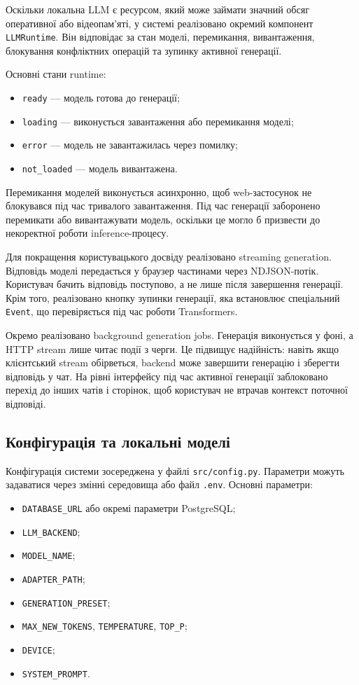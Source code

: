 Оскільки локальна LLM є ресурсом, який може займати значний обсяг оперативної або відеопам'яті, у системі реалізовано окремий компонент \texttt{LLMRuntime}. Він відповідає за стан моделі, перемикання, вивантаження, блокування конфліктних операцій та зупинку активної генерації.

Основні стани runtime:
\begin{itemize}
  \item \texttt{ready} --- модель готова до генерації;
  \item \texttt{loading} --- виконується завантаження або перемикання моделі;
  \item \texttt{error} --- модель не завантажилась через помилку;
  \item \texttt{not\_loaded} --- модель вивантажена.
\end{itemize}

Перемикання моделей виконується асинхронно, щоб web-застосунок не блокувався під час тривалого завантаження. Під час генерації заборонено перемикати або вивантажувати модель, оскільки це могло б призвести до некоректної роботи inference-процесу.

Для покращення користувацького досвіду реалізовано streaming generation. Відповідь моделі передається у браузер частинами через NDJSON-потік. Користувач бачить відповідь поступово, а не лише після завершення генерації. Крім того, реалізовано кнопку зупинки генерації, яка встановлює спеціальний \texttt{Event}, що перевіряється під час роботи Transformers.

Окремо реалізовано background generation jobs. Генерація виконується у фоні, а HTTP stream лише читає події з черги. Це підвищує надійність: навіть якщо клієнтський stream обірветься, backend може завершити генерацію і зберегти відповідь у чат. На рівні інтерфейсу під час активної генерації заблоковано перехід до інших чатів і сторінок, щоб користувач не втрачав контекст поточної відповіді.

\subsection{Конфігурація та локальні моделі}

Конфігурація системи зосереджена у файлі \texttt{src/config.py}. Параметри можуть задаватися через змінні середовища або файл \texttt{.env}. Основні параметри:
\begin{itemize}
  \item \texttt{DATABASE\_URL} або окремі параметри PostgreSQL;
  \item \texttt{LLM\_BACKEND};
  \item \texttt{MODEL\_NAME};
  \item \texttt{ADAPTER\_PATH};
  \item \texttt{GENERATION\_PRESET};
  \item \texttt{MAX\_NEW\_TOKENS}, \texttt{TEMPERATURE}, \texttt{TOP\_P};
  \item \texttt{DEVICE};
  \item \texttt{SYSTEM\_PROMPT}.
\end{itemize}


